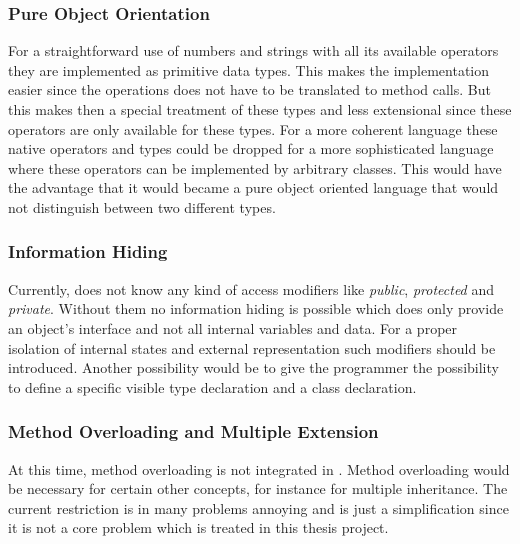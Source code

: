 \subsubsection{Pure Object Orientation}
For a straightforward use of numbers and strings with all its available
operators they are implemented as primitive data types. This makes the
implementation easier since the operations does not have to be translated
to method calls. But this makes then a special treatment of these types
and less extensional since these operators are only available for these
types. For a more coherent language these native operators and types could
be dropped for a more sophisticated language where these operators can be
implemented by arbitrary classes. This would have the advantage that it
would became a pure object oriented language that would not distinguish
between two different types.

\subsubsection{Information Hiding}
Currently, \ooplss does not know any kind of access modifiers like
\emph{public}, \emph{protected} and \emph{private}. Without them no
information hiding is possible which does only provide an object's interface
and not all internal variables and data. For a proper isolation of
internal states and external representation such modifiers should be
introduced. Another possibility would be to give the programmer the
possibility to define a specific visible type declaration and a class
declaration.

\subsubsection{Method Overloading and Multiple Extension}
At this time, method overloading is not integrated in \ooplss. Method
overloading would be necessary for certain other concepts, for instance
for multiple inheritance. The current restriction is in many problems
annoying and is just a simplification since it is not a core problem which
is treated in this thesis project.



